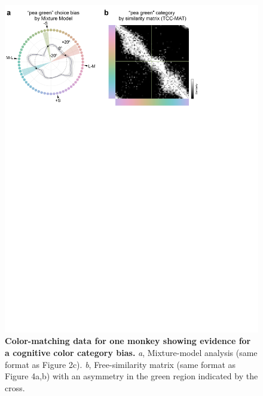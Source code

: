 \begin{figure}
    \begin{fullwidth}
    \centering
    \includegraphics[width=\textwidth+4cm,trim={0 18cm 0 0},clip]{../Figures/flat/F5_CastorCogBias_6.jpg}
    \caption{\textbf {Color-matching data for one monkey showing evidence for a cognitive color category bias.} 
    \emph{a}, Mixture-model analysis (same format as Figure 2c). 
	\emph{b}, Free-similarity matrix (same format as Figure 4a,b) with an asymmetry in the green region indicated by the cross.}
    \label{fig:IndiDataCogBias}
    \end{fullwidth}
\end{figure}

